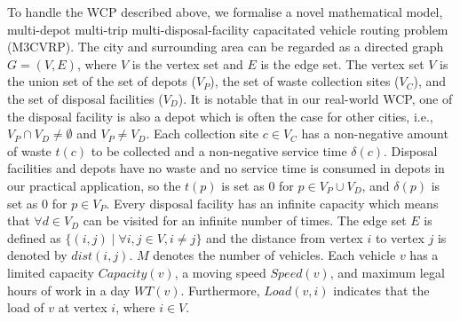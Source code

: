 \documentclass[journal]{IEEEtran}
\begin{document}
To handle the WCP described above, we formalise a novel mathematical model,  multi-depot multi-trip multi-disposal-facility capacitated vehicle routing problem (M3CVRP). The city and surrounding area can be regarded as a directed graph $G=(V,E)$, where $V$ is the vertex set and $E$ is the edge set. The vertex set $V$ is the union set of the set of depots ($V_P$), the set of waste collection sites ($V_C$), and the set of disposal facilities ($V_D$). It is notable that in our real-world WCP, one of the disposal facility is also a depot which is often the case for other cities, i.e., $V_P \cap V_D \neq \emptyset$ and $V_P \neq V_D $. Each collection site $c \in V_C$ has a non-negative amount of waste $t(c)$ to be collected and a non-negative service time $\delta(c)$. Disposal facilities and depots have no waste and no service time is consumed in depots in our practical application, so the $t(p)$ is set as $0$ for $p\in V_P \cup V_D$, and $\delta(p)$ is set as $0$ for $p\in V_P$. Every disposal facility has an infinite capacity which means that $\forall d \in V_{D}$ can be visited for an infinite number of times. The edge set $E$ is defined as $\{(i,j)\mid \forall i,j \in V, i \ne j\}$ and the distance from vertex $i$ to vertex $j$ is denoted by $dist(i,j)$. $M$ denotes the number of vehicles. Each vehicle $v$ has a limited capacity $Capacity(v)$, a moving speed $Speed(v)$, and maximum legal hours of work in a day $WT(v)$. Furthermore, $Load(v,i)$ indicates that the load of $v$ at vertex $i$, where $i\in V$.
\end{document}
